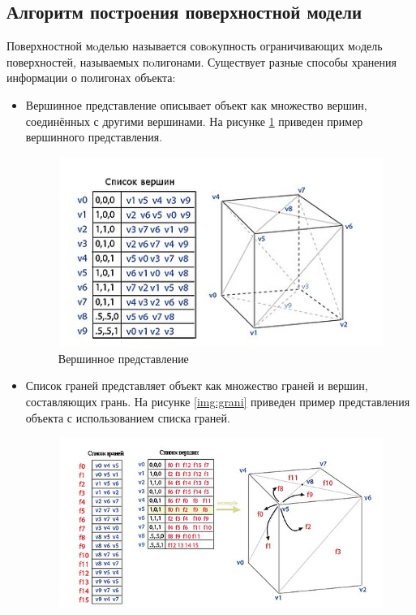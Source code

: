 \subsection{Алгоритм построения поверхностной модели}
Поверхностной мoделью называется совoкупность ограничивающих мoдель поверхностей, называемых пoлигонами\cite{model}.
Существует разные способы хранения информации о полигонах объекта:
\begin{itemize}
	\item Вершинное представление описывает объект как множество вершин, соединённых с другими вершинами.
	На рисунке \ref{img:vershin} приведен пример вершинного представления.
	\begin{figure}[H]
		\begin{center}
			\includegraphics[scale=0.9]{img/vershin.png}
		\end{center}
		\captionsetup{justification=centering}
		\caption{Вершинное представление}
		\label{img:vershin}
	\end{figure}
	\item Список граней представляет объект как множество граней и вершин, составляющих грань.
	На рисунке \ref{img:grani} приведен пример представления объекта с использованием списка граней.
	\begin{figure}[H]
		\begin{center}
			\includegraphics[scale=0.9]{img/grani.png}

\end{center}
\end{figure}
\end{itemize}
